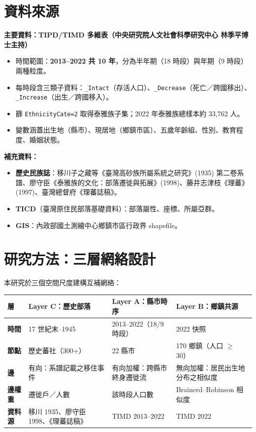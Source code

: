 \documentclass[11pt,a4paper]{article}
\begin{document}
\section{資料來源}
\textbf{主要資料：TIPD/TIMD 多維表（中央研究院人文社會科學研究中心 林季平博士主持）}
\vspace{-4pt}
\begin{itemize}
\item 時間範圍：\textbf{2013--2022 共 10 年}，分為半年期（18 時段）與年期（9 時段）兩種粒度。
\item 每時段含三類子資料：\texttt{\_Intact}（存活人口）、\texttt{\_Decrease}（死亡／跨國移出）、\texttt{\_Increase}（出生／跨國移入）。
\item 篩 \texttt{EthnicityCate=2} 取得泰雅族子集；2022 年泰雅族總樣本約 33{,}762 人。
\item 變數涵蓋出生地（縣市）、現居地（鄉鎮市區）、五歲年齡組、性別、教育程度、婚姻狀態。
\end{itemize}

\textbf{補充資料：}
\vspace{-4pt}
\begin{itemize}
\item \textbf{歷史民族誌}：移川子之藏等《臺灣高砂族所屬系統之研究》(1935) 第二卷系譜、廖守臣《泰雅族的文化：部落遷徙與拓展》(1998)、藤井志津枝《理蕃》(1997)、臺灣總督府《理蕃誌稿》。
\item \textbf{TICD}（臺灣原住民部落基礎資料）：部落屬性、座標、所屬亞群。
\item \textbf{GIS}：內政部國土測繪中心鄉鎮市區行政界 shapefile。
\end{itemize}

\section{研究方法：三層網絡設計}

本研究於三個空間尺度建構互補網絡：

\begin{center}\small
\renewcommand{\arraystretch}{1.3}
\begin{tabularx}{\textwidth}{|l|Y|Y|Y|}
\hline
\textbf{層} & \textbf{Layer C：歷史部落} & \textbf{Layer A：縣市時序} & \textbf{Layer B：鄉鎮共源} \\
\hline
\textbf{時間} & 17 世紀末--1945 & 2013--2022（18/9 時段）& 2022 快照 \\
\textbf{節點} & 歷史蕃社（300+）& 22 縣市 & 170 鄉鎮（人口 $\geq$ 30）\\
\textbf{邊} & 有向：系譜記載之移住事件 & 有向加權：跨縣市終身遷徙流 & 無向加權：居民出生地分布之相似度 \\
\textbf{邊權重} & 遷徙戶／人數 & 該時段人口數 & Brainerd--Robinson 相似度 \\
\textbf{資料源} & 移川 1935、廖守臣 1998、《理蕃誌稿》 & TIMD 2013--2022 & TIMD 2022 \\
\hline
\end{tabularx}
\end{center}
\end{document}

